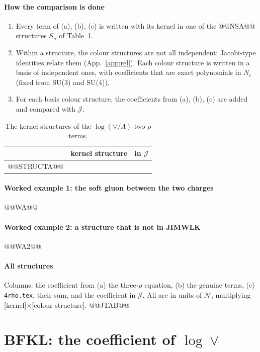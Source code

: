 \documentclass[10pt]{article}
\numberwithin{equation}{section}
\newcommand{\NN}{\mathcal N}
\newcommand{\J}{\mathcal J}
\begin{document}
\subsection{How the comparison is done}
\begin{enumerate}
\item Every term of (a), (b), (c) is written with its kernel in one of the @@NSA@@ structures $S_n$ of Table~\ref{tab:SA}.
\item Within a structure, the colour structures are not all independent: Jacobi-type identities relate them (App.~\ref{app:rel}). Each colour structure is written in a basis of independent ones, with coefficients that are exact polynomials in $N_c$ (fixed from SU(3) and SU(4)).
\item For each basis colour structure, the coefficients from (a), (b), (c) are added and compared with $\J$.
\end{enumerate}
\begin{table}[h]
\centering\small
\begin{tabular}{@{}l l c@{}}
& kernel structure & in $\J$\\ \hline
@@STRUCTA@@
\end{tabular}
\caption{The kernel structures of the $\log(\vee/\Lambda)$ two-$\rho$ terms.}
\label{tab:SA}
\end{table}

\subsection{Worked example 1: the soft gluon between the two charges}
@@WA@@

\subsection{Worked example 2: a structure that is not in JIMWLK}
@@WA2@@

\subsection{All structures}
Columns: the coefficient from (a) the three-$\rho$ equation, (b) the genuine terms, (c) \texttt{4rho.tex}, their sum, and the coefficient in $\J$. All are in units of $\NN$, multiplying [kernel]$\times$[colour structure].
@@JTAB@@

\part{BFKL: the coefficient of \texorpdfstring{$\log\vee$}{log vee}}
\end{document}
